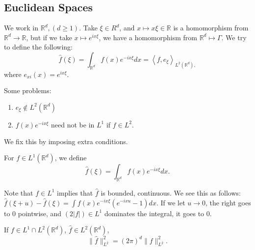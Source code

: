 \documentclass[11pt]{scrartcl}
\newcommand{\R}{\mathbb{R}}
\begin{document}
\subsection{Euclidean Spaces}
We work in $\R^d, (d \ge 1)$.  Take $\xi \in R^d$, and $x \mapsto x\xi \in \R$ is a homomorphism from $\R^d \rightarrow \R$, but if we take $x \mapsto e^{ix\xi}$, we have a homomorphism from $\R^d\mapsto \Gamma$.  We try to define the following:
$$\hat{f}(\xi) = \int_{\R^d} f(x)e^{-ix\xi}dx = \left <f, e_{\xi}\right >_{L^2(\R^d),}$$
where $e_{xi}(x) = e^{ix\xi}$.

Some problems:
\begin{enumerate}
\item $e_\xi \not \in L^2(\R^d)$
\item $f(x)e^{-ix\xi}$ need not be in $L^1$ if $f \in L^2$.
\end{enumerate}
We fix this by imposing extra conditions.
\begin{definition} For $f \in L^1(\R^d)$, we define
$$\hat{f}(\xi) = \int_{\R^d} f(x)e^{-ix\xi}dx.$$
\end{definition} 

Note that $f \in L^1$ implies that $\hat{f}$ is bounded, continuous.  We see this as follows:
$\hat{f}(\xi + u) - \hat{f}(\xi) = \int f(x)e^{-ix\xi}(e^{-ixu}-1)dx$.  If we let $u \rightarrow 0$, the right goes to $0$ pointwise, and $(2|f|) \in L^1$ dominates the integral, it goes to $0$.  
\begin{proposition}If $f \in L^1 \cap L^2(\R^d)$, $\hat{f}\in L^2(\R^d)$, 
$$\|\hat{f}\|_{L^2}^2 = (2\pi)^d \|f\|_{L^2}^2.$$
\end{proposition}
\end{document}
